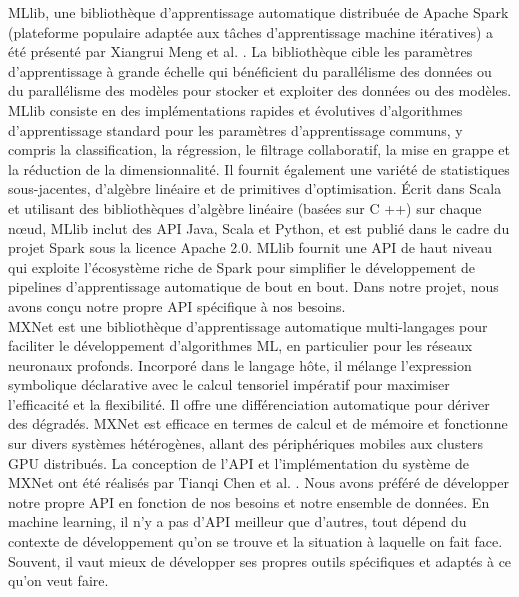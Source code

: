 \documentclass[12pt, french]{report}
\begin{document}
MLlib, une bibliothèque d'apprentissage automatique distribuée de Apache Spark (plateforme populaire adaptée aux tâches d'apprentissage machine itératives) a été présenté par Xiangrui Meng et al. \cite{key34}. La bibliothèque cible les paramètres d'apprentissage à grande échelle qui bénéficient du parallélisme des données ou du parallélisme des modèles pour stocker et exploiter des données ou des modèles. MLlib consiste en des implémentations rapides et évolutives d'algorithmes d'apprentissage standard pour les paramètres d'apprentissage communs, y compris la classification, la régression, le filtrage collaboratif, la mise en grappe et la réduction de la dimensionnalité. Il fournit également une variété de statistiques sous-jacentes, d'algèbre linéaire et de primitives d'optimisation. Écrit dans Scala et utilisant des bibliothèques d'algèbre linéaire (basées sur C ++) sur chaque nœud, MLlib inclut des API Java, Scala et Python, et est publié dans le cadre du projet Spark sous la licence Apache 2.0. MLlib  fournit une API de haut niveau qui exploite l'écosystème riche de Spark pour simplifier le développement de pipelines d'apprentissage automatique de bout en bout. Dans notre projet, nous avons conçu notre propre API spécifique à nos besoins. \\

MXNet est une bibliothèque d'apprentissage automatique multi-langages pour faciliter le développement d'algorithmes ML, en particulier pour les réseaux neuronaux profonds. Incorporé dans le langage hôte, il mélange l'expression symbolique déclarative avec le calcul tensoriel impératif pour maximiser l'efficacité et la flexibilité. Il offre une différenciation automatique pour dériver des dégradés. MXNet est efficace en termes de calcul et de mémoire et fonctionne sur divers systèmes hétérogènes, allant des périphériques mobiles aux clusters GPU distribués. La conception de l'API et l'implémentation du système de MXNet ont été réalisés par Tianqi Chen et al. \cite{key35}. Nous avons préféré de développer notre propre API en fonction de nos besoins et notre ensemble de données. En machine learning, il n'y a pas d'API meilleur que d'autres, tout dépend du contexte de développement qu'on se trouve et la situation à laquelle on fait face. Souvent, il vaut mieux de développer ses propres outils spécifiques et adaptés à ce qu'on veut faire. \\
\end{document}
